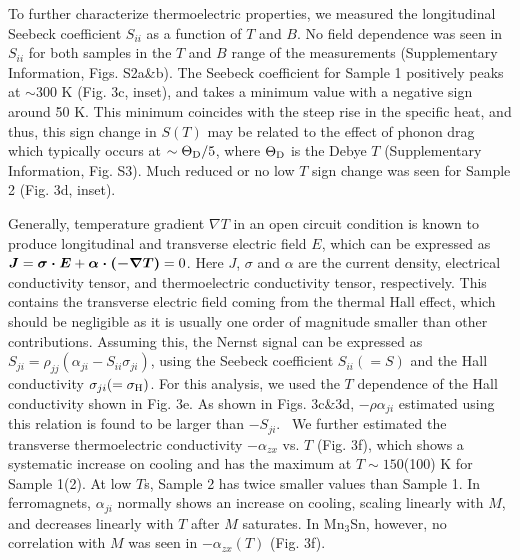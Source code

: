 \documentclass[amsmath,amssymb]{nature}
\begin{document}
To further characterize thermoelectric properties, we measured the longitudinal Seebeck coefficient $S_{ii}$ as a function of $T$ and $B$.  No field dependence was seen in $S_{ii}$ for both samples in the $T$ and $B$ range of the measurements (Supplementary Information, Figs. S2a\&b).
The Seebeck coefficient for Sample 1 positively peaks at $\sim 300$ K (Fig. 3c, inset), and takes a minimum value with a negative sign around 50 K. %
This minimum coincides with the steep rise in the specific heat, and thus, this sign change in $S(T)$ may be related to the effect of phonon drag which typically occurs at $\sim \Theta_{\rm D}/5$, where $\Theta_{\rm D}$ is the Debye $T$ (Supplementary Information, {Fig. S3}). Much reduced or no low $T$ sign change was seen for Sample 2 (Fig. 3d, inset).%

Generally, temperature gradient \mbox{\boldmath $\nabla T$} in an open circuit condition is known to produce longitudinal and transverse electric field \mbox{\boldmath $E$}, which can be expressed as $\mbox{\boldmath $J$} =  \mbox{\boldmath $\sigma \cdot E$} + \mbox{\boldmath $ \alpha   \cdot (- \nabla T)$}= 0$. Here \mbox{\boldmath $J$}, \mbox{\boldmath $\sigma$} and \mbox{\boldmath $\alpha$} are the current density, electrical conductivity tensor, and thermoelectric conductivity tensor, respectively. This contains the transverse electric field coming from the thermal Hall effect, which should be negligible as it is usually one order of magnitude smaller than other contributions\cite{Lee2004,Miyasato2007,hanasaki2008}. Assuming this, the Nernst signal can be expressed as $S_{ji} = \rho_{jj} (\alpha_{ji} - S_{ii} \sigma_{ji})$, using the Seebeck coefficient $S_{ii} (=S)$ and the Hall conductivity $\sigma_{ji} (=\sigma_{\rm H})$. For this analysis, we used the $T$ dependence of the Hall conductivity shown in Fig. 3e. As shown in Figs. 3c\&3d, $-\rho \alpha_{ji}$ estimated using this relation is found to be larger than $-S_{ji}$. ~We further estimated the transverse thermoelectric conductivity $-\alpha_{zx}$ vs. $T$ (Fig. 3f), which shows a systematic increase on cooling and has the maximum at $T \sim 150$(100) K for Sample 1(2). At low $T$s, Sample 2 has twice smaller values than Sample 1. In ferromagnets, $\alpha_{ji}$ normally shows an increase on cooling, scaling linearly with $M$, and decreases linearly with $T$ after $M$ saturates\cite{Lee2004,Miyasato2007}.  In Mn$_3$Sn, however, no correlation with $M$ was seen in $-\alpha_{zx}(T)$ (Fig. 3f). 
\end{document}
